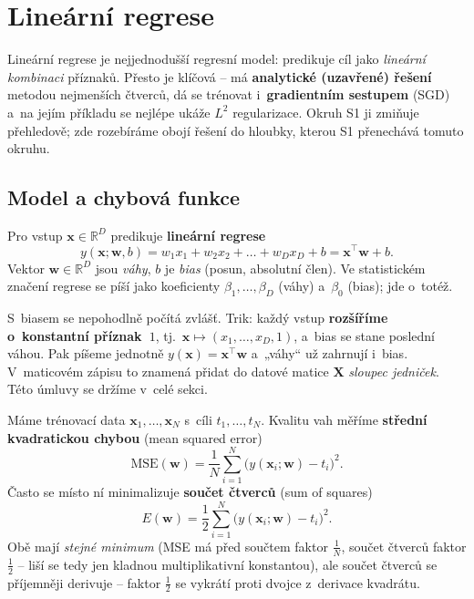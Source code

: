 \section{Lineární regrese}\label{sec:linreg}

Lineární regrese je nejjednodušší regresní model: predikuje cíl jako \emph{lineární kombinaci} příznaků. Přesto je klíčová -- má \textbf{analytické (uzavřené) řešení} metodou nejmenších čtverců, dá se trénovat i~\textbf{gradientním sestupem} (SGD) a~na jejím příkladu se nejlépe ukáže $L^2$ regularizace. Okruh S1 ji zmiňuje přehledově; zde rozebíráme obojí řešení do hloubky, kterou S1 přenechává tomuto okruhu.

\subsection{Model a chybová funkce}

\begin{definice}
Pro vstup $\mathbf{x}\in\mathbb{R}^D$ predikuje \textbf{lineární regrese}
\[ y(\mathbf{x};\mathbf{w},b)= w_1 x_1 + w_2 x_2 + \dots + w_D x_D + b = \mathbf{x}^{\!\top}\mathbf{w} + b. \]
Vektor $\mathbf{w}\in\mathbb{R}^D$ jsou \emph{váhy}, $b$ je \emph{bias} (posun, absolutní člen). Ve statistickém značení regrese se píší jako koeficienty $\beta_1,\dots,\beta_D$ (váhy) a~$\beta_0$ (bias); jde o~totéž.
\end{definice}

\begin{intuice}
S~biasem se nepohodlně počítá zvlášť. Trik: každý vstup \textbf{rozšíříme o~konstantní příznak~$1$}, tj.\ $\mathbf{x}\mapsto(x_1,\dots,x_D,1)$, a~bias se stane poslední váhou. Pak píšeme jednotně $y(\mathbf{x})=\mathbf{x}^{\!\top}\mathbf{w}$ a~„váhy`` už zahrnují i~bias. V~maticovém zápisu to znamená přidat do datové matice $\mathbf{X}$ \emph{sloupec jedniček}. Této úmluvy se držíme v~celé sekci.
\end{intuice}

\begin{definice}
Máme trénovací data $\mathbf{x}_1,\dots,\mathbf{x}_N$ s~cíli $t_1,\dots,t_N$. Kvalitu vah měříme \textbf{střední kvadratickou chybou} (mean squared error)
\[ \mathrm{MSE}(\mathbf{w})=\frac1N\sum_{i=1}^N\big(y(\mathbf{x}_i;\mathbf{w})-t_i\big)^2. \]
Často se místo ní minimalizuje \textbf{součet čtverců} (sum of squares)
\[ E(\mathbf{w})=\frac12\sum_{i=1}^N\big(y(\mathbf{x}_i;\mathbf{w})-t_i\big)^2. \]
Obě mají \emph{stejné minimum} (MSE má před součtem faktor $\tfrac1N$, součet čtverců faktor $\tfrac12$ -- liší se tedy jen kladnou multiplikativní konstantou), ale součet čtverců se příjemněji derivuje -- faktor $\tfrac12$ se vykrátí proti dvojce z~derivace kvadrátu.
\end{definice}

